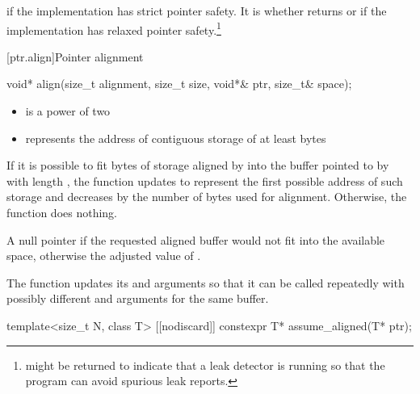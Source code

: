 \begin{itemdescr}
\pnum
\returns
{} if the implementation has strict pointer
safety. It is
whether
 returns  or
 if the implementation has relaxed pointer
safety.\footnote{ might be returned to indicate
that a leak detector is running so that the program can avoid spurious leak
reports.}
\end{itemdescr}


[ptr.align]{Pointer alignment}

%
\begin{itemdecl}
void* align(size_t alignment, size_t size, void*& ptr, size_t& space);
\end{itemdecl}

\begin{itemdescr}
\pnum
\expects
\begin{itemize}
\item
{} is a power of two

\item
{} represents the address of contiguous storage of at least
 bytes
\end{itemize}

\pnum
\effects
If it is possible to fit  bytes
of storage aligned by  into the buffer pointed to by
 with length , the function updates
 to represent the first possible address of such storage
and decreases  by the number of bytes used for alignment.
Otherwise, the function does nothing.

\pnum
\returns
A null pointer if the requested aligned buffer
would not fit into the available space, otherwise the adjusted value
of .

\pnum
\begin{note}
The function updates its 
and  arguments so that it can be called repeatedly
with possibly different  and 
arguments for the same buffer.
\end{note}
\end{itemdescr}

%
\begin{itemdecl}
template<size_t N, class T>
  [[nodiscard]] constexpr T* assume_aligned(T* ptr);
\end{itemdecl}

